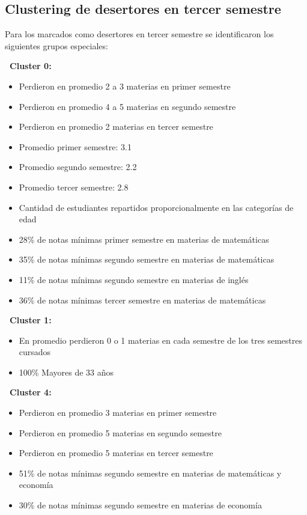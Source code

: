 \documentclass[fleqn,10pt]{SelfArx} %
\begin{document}
\subsection{Clustering de desertores en tercer semestre}

Para los marcados como desertores en tercer semestre se identificaron los siguientes grupos especiales:

{\bf \textbullet\ Cluster 0:}\\

\begin{itemize}
	\item Perdieron en promedio 2 a 3 materias en primer semestre
	\item Perdieron en promedio 4 a 5 materias en segundo semestre
	\item Perdieron en promedio 2 materias en tercer semestre
	\item Promedio primer semestre: 3.1
	\item Promedio segundo semestre: 2.2
	\item Promedio tercer semestre: 2.8
	\item Cantidad de estudiantes repartidos proporcionalmente en las categorías de edad
	\item 28\% de notas mínimas primer semestre en materias de matemáticas
	\item 35\% de notas mínimas segundo semestre en materias de matemáticas
	\item 11\% de notas mínimas segundo semestre en materias de inglés
	\item 36\% de notas mínimas tercer semestre en materias de matemáticas
\end{itemize}

{\bf \textbullet\ Cluster 1:}\\
 
\begin{itemize}
	\item En promedio perdieron 0 o 1 materias en cada semestre de los tres semestres cursados
	\item 100\% Mayores de 33 años
\end{itemize}

{\bf \textbullet\ Cluster 4:}\\

\begin{itemize}
	\item Perdieron en promedio 3 materias en primer semestre
	\item Perdieron en promedio 5 materias en segundo semestre
	\item Perdieron en promedio 5 materias en tercer semestre
	\item 51\% de notas mínimas segundo semestre en materias de matemáticas y economía
	\item 30\% de notas mínimas segundo semestre en materias de economía
\end{itemize}
\end{document}
